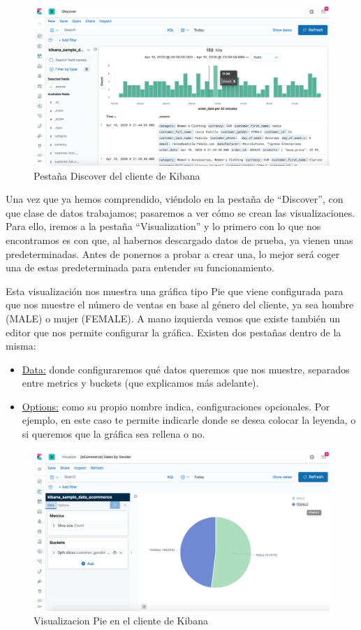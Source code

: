 \documentclass[a4paper, 12pt]{book}
\begin{document}
\begin{figure}[H]
  \centering
  \includegraphics[width=12cm, keepaspectratio]{img/development/Discover-kibana.png}
  \caption{Pestaña Discover del cliente de Kibana}
  \label{fig:kibanadiscover}
\end{figure}

Una vez que ya hemos comprendido, viéndolo en la pestaña de “Discover”, con que clase de datos trabajamos; pasaremos a ver cómo se crean las visualizaciones. Para ello, iremos a la pestaña “Visualization” y lo primero con lo que nos encontramos es con que, al habernos descargado datos de prueba, ya vienen unas predeterminadas. Antes de ponernos a probar a crear una, lo mejor será coger una de estas predeterminada para entender su funcionamiento.

Esta visualización nos muestra una gráfica tipo Pie que viene configurada para que nos muestre el número de ventas en base al género del cliente, ya sea hombre (MALE) o mujer (FEMALE). A mano izquierda vemos que existe también un editor que nos permite configurar la gráfica. Existen dos pestañas dentro de la misma:

\begin{itemize}
    \item \underline{Data:} donde configuraremos qué datos queremos que nos muestre, separados entre metrics y buckets (que explicamos más adelante).
    \item \underline{Options:} como su propio nombre indica, configuraciones opcionales. Por ejemplo, en este caso te permite indicarle donde se desea colocar la leyenda, o si queremos que la gráfica sea rellena o no.
\end{itemize}

\begin{figure}[H]
  \centering
  \includegraphics[width=12cm, keepaspectratio]{img/development/Kibana-visualization-pie.png}
  \caption{Visualizacion Pie en el cliente de Kibana}
  \label{fig:kibanapie}
\end{figure}
\end{document}
